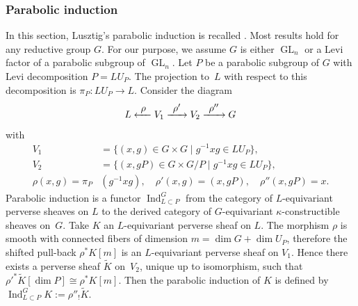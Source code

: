 \documentclass[JEP,XML,SOM,NoEqCountersInSection,Unicode,published]{cedram}
\def\To#1{\mathchoice{\xrightarrow{\textstyle\kern4pt#1\kern3pt}}{\stackrel{#1}{\longrightarrow}}{}{}}
\def\From#1{\mathchoice{\xleftarrow{\textstyle~#1~}}{\stackrel{#1}{\longleftarrow}}{}{}}
\theoremstyle{definition}
\theoremstyle{plain}
\DeclareMathOperator{\Ind}{Ind}
\DeclareMathOperator{\GL}{GL}
\newcommand{\inv}{^{-1}}
\begin{document}
\subsubsection{Parabolic induction}
In this section, Lusztig's parabolic induction is recalled \cite{Lusztig1984,lusztig_character_sheaves,Lusztig1986}. Most results hold for any reductive group $G$. For our purpose, we assume $G$ is either $\GL_n$ or a Levi factor of a parabolic subgroup of $\GL_n$. Let $P$ be a parabolic subgroup of $G$ with Levi decomposition $P=L U_P$. The projection to~$L$ with respect to this decomposition is $\pi_{P}: L U_P\to L$. Consider the diagram
\begin{equation}\label{parabolic_induction_diagramm}
L \From{\rho} V_1 \To{\rho'} V_2 \To{\rho''} G
\end{equation}
with
\begin{align*}
V_1&=\lbrace (x,g)\in G\times G \mid g\inv x g \in L U_P\rbrace, \\
V_2 &=\lbrace (x, g P)\in G\times G/P \mid g\inv x g \in L U_P\rbrace,\\
\rho(x,g)=\pi_{P}&(g\inv x g), \quad \rho'(x,g)= (x,g P), \quad
\rho''(x,g P)=x.
\end{align*}
Parabolic induction is a functor $\Ind_{L\subset P}^{G}$ from the category of $L$-equivariant perverse sheaves on $L$ to the derived category of $G$-equivariant $\kappa$-constructible sheaves on~$G$.
Take $K$ an $L$-equivariant perverse sheaf on $L$. The morphism $\rho$ is smooth with connected fibers of dimension $m=\dim G +\dim U_P$, therefore the shifted pull-back $\rho^* K[m]$ is an $L$-equivariant perverse sheaf on $V_1$. Hence there exists a perverse sheaf $\widetilde{K}$ on~$V_2$, unique up to isomorphism, such that $\rho'^* \widetilde{K}[\dim P] \cong \rho^* K[m]$. Then the parabolic induction of $K$ is defined by $\Ind_{L \subset P}^{G} K := \rho''_{!}\widetilde{K}$.
\end{document}
